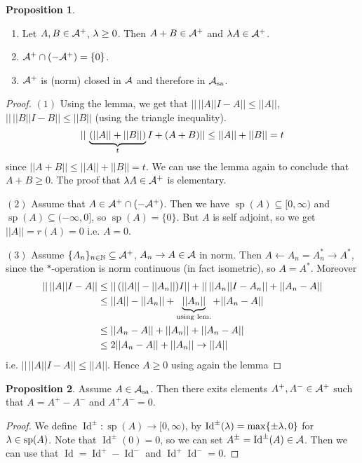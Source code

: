 \documentclass[10pt,english,a4paper]{article}
\theoremstyle{definition}
\newtheorem*{proposition}{Proposition}
\def\Assa{\As_{\text{sa}}}
\DeclareMathOperator{\Id}{Id}
\DeclareMathOperator{\Sp}{sp}
\begin{document}
\begin{proposition}
\begin{enumerate}[(1)]
    \leavevmode
    \item Let $A,B \in \mathcal{A}^+$, $\lambda \geq 0$. Then $A+B \in \mathcal{A}^+$ and 
    $\lambda A \in \mathcal{A}^+$.

    \item $\mathcal{A}^+ \cap (-\mathcal{A}^+) = \{0\}$. 

    \item $\mathcal{A}^+$ is (norm) closed in $\mathcal{A}$ and therefore in $\Assa$.

\end{enumerate}   
\begin{proof}
    $(1)$ Using the lemma, we get that 
    $||\,||A|| I -A|| \leq ||A||$, $||\, ||B|| I - B || \leq ||B||$ (using the 
triangle inequality). 
    \[ ||\,\underbrace{(||A|| +||B||)}_{t} I + (A+B) || \leq ||A|| + ||B|| = t \]
    since $||A+B|| \leq ||A|| + ||B|| = t$. We can use the lemma again to conclude that
    $A+B \geq 0$. The proof that $\lambda A \in \mathcal{A}^+$ is elementary.

    $(2)$ Assume that $A \in \mathcal{A}^+\cap (-\mathcal{A}^+)$. Then we have $\Sp(A)\subseteq[0,\infty)$ 
and $\Sp(A)\subseteq (-\infty,0]$, so $\Sp(A) = \{0\}$. But $A$ is self adjoint, 
so we get $||A|| = r(A) = 0$ i.e. $A = 0$.

$(3)$ Assume $\{A_n\}_{n\in\mathbb{N}} \subseteq \mathcal{A}^+$, $A_n\to A \in \mathcal{A}$ in norm.
Then $A \leftarrow A_n = A_{n}^{*} \to A^{*}$, since the $*$-operation is norm 
continuous (in fact isometric), so $A = A^*$.
Moreover 
\begin{align*}
    ||\,||A||I-A||&\leq ||\,(||A|| -||A_n||)I|| + ||\,||A_n|| I - A_n|| + 
    ||A_n - A|| \\
    &\leq ||A|| - ||A_n|| + \underbrace{||A_n ||}_{\text{using lem.}} + ||A_n - A|| \\
    &\leq ||A_n - A|| + ||A_n|| + ||A_n-A|| \\
    &\leq 2||A_n-A|| + ||A_n|| \to ||A||
\end{align*}
i.e. $||\,||A|| I - A || \leq ||A||$. Hence $A\geq 0$ using again the lemma
\end{proof}
\end{proposition}
\begin{proposition}
    Assume $A \in \Assa$. Then there exits elements $A^+, A^- \in \mathcal{A}^+$ such that 
    $A = A^+ -A^-$ and $A^+A^- = 0$.
\end{proposition}
\begin{proof}
    We define $\Id^{\pm} \colon \Sp(A) \to [0,\infty)$, by 
    $\Id^{\pm}(\la) = \max\{\pm \la, 0\}$ for $\la \in \Sp(A)$.
    Note that $\Id^{\pm} (0) = 0$, so we can set $A^{\pm} =\Id^{\pm}(A) \in \As$.
    Then we can use that $\Id = \Id^{+} - \Id^{-}$ and $\Id^+ \Id^{-}=0$.
\end{proof}
\end{document}
